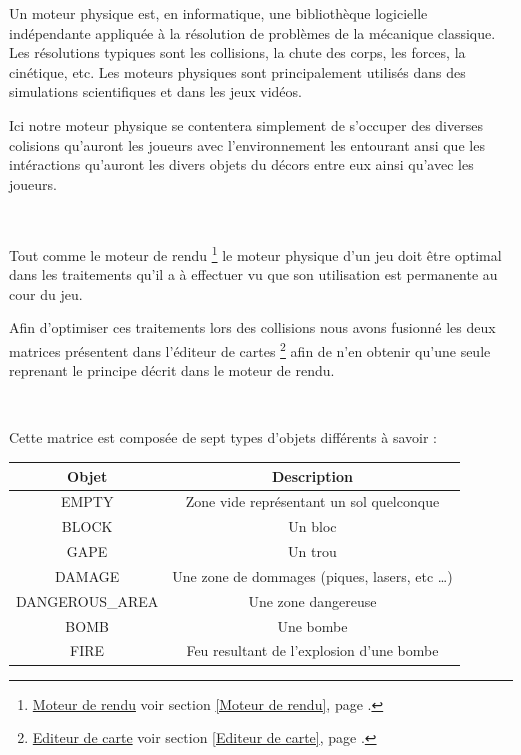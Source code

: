			\hypertarget{Moteur physique}{}
			\label{Moteur physique}
			
			Un moteur physique est, en informatique, une bibliothèque logicielle 
			indépendante appliquée à la résolution de problèmes de la mécanique
			classique.  Les résolutions typiques sont les collisions, la chute des corps,
			les forces, la cinétique, etc.
			Les moteurs physiques sont principalement utilisés dans des simulations 
			scientifiques et dans les jeux vidéos.
			
			
			Ici notre moteur physique se contentera simplement de s'occuper des diverses
			colisions qu'auront les joueurs avec l'environnement les entourant ansi que
			les intéractions qu'auront les divers objets du décors entre eux ainsi qu'avec les joueurs.

			$\,$		
			
			Tout comme le moteur de rendu
			\footnote{
				\hyperlink{Moteur de rendu}{Moteur de rendu}
				\og voir section \ref{Moteur de rendu}, page \pageref{Moteur de rendu}.\fg
			}
			le moteur physique d'un jeu doit être optimal dans les traitements qu'il a à
			effectuer vu que son utilisation est permanente au cour du jeu.
			
			
			Afin d'optimiser ces traitements lors des collisions nous avons fusionné les
			deux matrices présentent dans l'éditeur de cartes
			\footnote{
				\hyperlink{Editeur de carte}{Editeur de carte}
				\og voir section \ref{Editeur de carte}, page \pageref{Editeur de carte}.\fg
			}
			afin de n'en obtenir qu'une seule reprenant le principe décrit dans le moteur
			de rendu\footnotemark[2].
			
			$\,$
			
			Cette matrice est composée de sept types d'objets différents à savoir :
			
			\begin{center}
				\begin{tabular}{|c|c|} \hline
				Objet  & Description \\\hline
				EMPTY  & Zone vide représentant un sol quelconque\\\hline
				BLOCK  & Un bloc \\\hline
				GAPE   & Un trou \\\hline
				DAMAGE & Une zone de dommages (piques, lasers, etc \ldots) \\\hline
				DANGEROUS\_AREA & Une zone dangereuse\\\hline
				BOMB & Une bombe\\\hline
				FIRE & Feu resultant de l'explosion d'une bombe\\\hline
				\end{tabular}
			\end{center}
			
